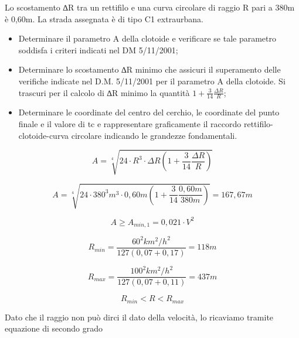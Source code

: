 \documentclass[
a4paper,
12pt, 
twoside]{scrbook}
\begin{document}
{{{{{{{{   \begin{boxK}
   	Lo scostamento ∆R tra un rettifilo e una curva circolare di raggio R pari a 380m è 0,60m. La strada assegnata è di tipo C1 extraurbana.
   	\begin{itemize}
   		\item Determinare il parametro A della clotoide e verificare se tale parametro soddisfa i criteri indicati nel DM 5/11/2001; 
   		\item Determinare lo scostamento ∆R minimo che assicuri il superamento delle verifiche indicate nel D.M. 5/11/2001 per il parametro A della clotoide. Si trascuri per il calcolo di ∆R minimo la quantità $1+\frac{3}{14}\frac{\Delta R}{R}$;
   		\item Determinare le coordinate del centro del cerchio, le coordinate del punto finale e il valore di tc e rappresentare graficamente il raccordo rettifilo-clotoide-curva circolare indicando le grandezze fondamentali. 
   	\end{itemize}
   \end{boxK}  
   
   \begin{equation}
   	A=\sqrt[4]{24\cdot R^3\cdot \Delta R(1+\frac{3}{14}\frac{\Delta R}{R})}
   \end{equation} 	
   
   \begin{equation}
   	A=\sqrt[4]{24\cdot 380^3m^3\cdot 0,60m(1+\frac{3}{14}\frac{0,60m}{380m})}=167,67m
   \end{equation} 	
   
   \begin{equation}
   	A\geq A_{min,1}=0,021\cdot V^2
   \end{equation} 	
   
   \begin{equation}
   	R_{min}=\frac{60^2km^2/h^2}{127(0,07+0,17)}=118m
   \end{equation}
   
   \begin{equation}
   	R_{max}=\frac{100^2km^2/h^2}{127(0,07+0,11)}=437m
   \end{equation} 	
   
   \begin{equation}
   	R_{min}<R<R_{max} 
   \end{equation} 	
   
   \begin{boxF}
   	Dato che il raggio non può dirci il dato della velocità, lo ricaviamo tramite equazione di secondo grado
   \end{boxF}
   
}}}}}}}}
\end{document}
